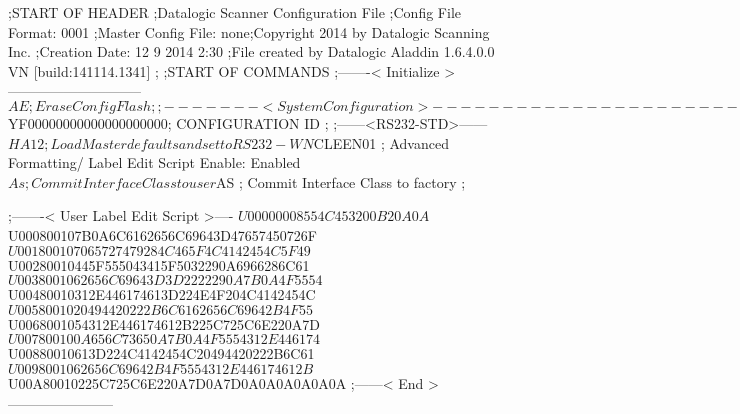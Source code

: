 ;START OF HEADER
;Datalogic Scanner Configuration File
;Config File Format: 0001
;Master Config File: none;Copyright 2014 by Datalogic Scanning Inc.
;Creation Date: 12 9 2014 2:30
;File created by Datalogic Aladdin 1.6.4.0.0 VN [build:141114.1341]
;
;START OF COMMANDS
;-------< Initialize >-----------------------------
$AE                 ; Erase Config Flash
;
;-------< System Configuration >-------------------------------
$YF00000000000000000000; CONFIGURATION ID
;
;------<RS232-STD>------
$HA12               ; Load Master defaults and set to RS232-WN
$CLEEN01            ; Advanced Formatting/ Label Edit Script Enable: Enabled
$As                 ; Commit Interface Class to user
$AS                 ; Commit Interface Class to factory
;

;-------< User Label Edit Script >----
$U00000008554C453200B20A0A
$U000800107B0A6C6162656C69643D47657450726F
$U001800107065727479284C465F4C4142454C5F49
$U00280010445F555043415F5032290A6966286C61
$U0038001062656C69643D3D2222290A7B0A4F5554
$U00480010312E446174613D224E4F204C4142454C
$U0058001020494420222B6C6162656C69642B4F55
$U0068001054312E446174612B225C725C6E220A7D
$U007800100A656C73650A7B0A4F5554312E446174
$U00880010613D224C4142454C20494420222B6C61
$U0098001062656C69642B4F5554312E446174612B
$U00A80010225C725C6E220A7D0A7D0A0A0A0A0A0A
;------< End >-----------------------
